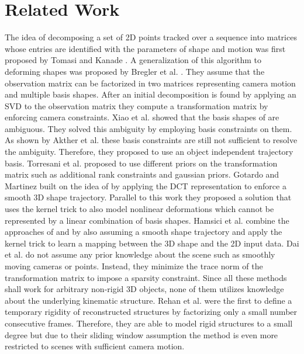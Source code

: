 \documentclass[10pt,letterpaper]{article}
\begin{document}
\section{Related Work}
The idea of decomposing a set of 2D points tracked over a sequence into matrices whose entries are identified with the parameters of shape and motion was first proposed by Tomasi and Kanade \cite{tomasi92}. A generalization of this algorithm to deforming shapes was proposed by Bregler et al. \cite{Bregler2000}. They assume that the observation matrix can be factorized in two matrices representing camera motion and multiple basis shapes. After an initial decomposition is found by applying an SVD to the observation matrix they compute a transformation matrix by enforcing camera constraints. Xiao et al. \cite{Xiao2004} showed that the basis shapes of \cite{Bregler2000} are ambiguous. They solved this ambiguity by employing basis constraints on them. As shown by Akther et al. \cite{akhter2011trajectory} these basis constraints are still not sufficient to resolve the ambiguity. Therefore, they proposed to use an object independent trajectory basis. Torresani et al. \cite{Torresani03,torresani08,Torresani01} proposed to use different priors on the transformation matrix such as additional rank constraints and gaussian priors. Gotardo and Martinez \cite{gotardo11} built on the idea of \cite{akhter2011trajectory} by applying the DCT representation to enforce a smooth 3D shape trajectory. Parallel to this work they proposed a solution that uses the kernel trick to also model nonlinear deformations \cite{gotardo112} which cannot be represented by a linear combination of basis shapes. Hamsici et al. \cite{gotardo12} combine the approaches of \cite{gotardo11} and \cite{gotardo112} by also assuming a smooth shape trajectory and apply the kernel trick to learn a mapping between the 3D shape and the 2D input data. Dai et al. \cite{li12} do not assume any prior knowledge about the scene such as smoothly moving cameras or points. Instead, they minimize the trace norm of the transformation matrix to impose a sparsity constraint. Since all these methods shall work for arbitrary non-rigid 3D objects, none of them utilizes knowledge about the underlying kinematic structure. Rehan et al. \cite{Rehan2014} were the first to define a temporary rigidity of reconstructed structures by factorizing only a small number consecutive frames. Therefore, they are able to model rigid structures to a small degree but due to their sliding window assumption the method is even more restricted to scenes with sufficient camera motion. 
\end{document}

